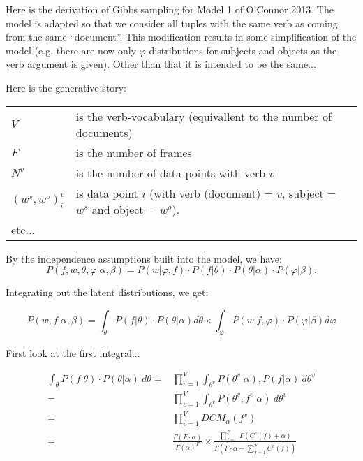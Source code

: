 \documentclass{article}
\renewcommand\phi\varphi
\begin{document}
Here is the derivation of Gibbs sampling for Model 1 of O'Connor 2013.
The model is adapted so that we consider all tuples with the same verb as coming
from the same ``document''.
This modification results in some simplification of the model (e.g. there are now
only $\phi$ distributions for subjects and objects as the verb argument is given).
Other than that it is intended to be the same...

Here is the generative story:


\begin{table}[h]
\begin{tabular}{ll}
$V$ & is the verb-vocabulary (equivallent to the number of documents)\\
$F$ & is the number of frames\\
$N^v$ & is the number of data points with verb $v$\\
$(w^s, w^o)^v_i$ & is data point $i$ (with verb (document) = $v$, subject = $w^s$ and object = $w^o$).\\
etc...\\
\end{tabular}
\end{table}

By the independence assumptions built into the model, we have:
\[
P(f,w,\theta,\phi|\alpha,\beta) = P(w|\phi,f) \cdot P(f|\theta) \cdot P(\theta|\alpha) \cdot P(\phi|\beta).
\]

Integrating out the latent distributions, we get:

\[
P(w,f|\alpha,\beta) = \int_\theta P(f|\theta)\cdot P(\theta|\alpha) d\theta \times
                      \int_\phi   P(w|f,\phi)\cdot P(\phi|\beta) d\phi
\]

First look at the first integral...

\begin{align*}
\int_{\theta} P(f|\theta)\cdot P(\theta|\alpha)\ d\theta
    =& \prod_{v=1}^V \int_{\theta^v} P(\theta^v|\alpha), P(f|\alpha)\ d\theta^v\\
    =& \prod_{v=1}^V \int_{\theta^v} P(\theta^v,f^v|\alpha)\ d\theta^v\\
    =& \prod_{v=1}^V DCM_\alpha(f^v)\\
    =& \frac{\Gamma(F\cdot\alpha)}{\Gamma(\alpha)^F} \times
       \frac{\prod_{f=1}^F\Gamma(C^v(f) + \alpha)}{\Gamma(F\cdot\alpha +
       \sum_{f=1}^FC^v(f))}
\end{align*}
\end{document}
